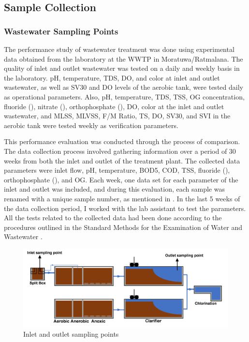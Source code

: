 \subsection{Sample Collection}

\subsubsection{Wastewater Sampling Points}
The performance study of wastewater treatment was done using experimental data obtained from the laboratory at the \ac{WWTP} in Moratuwa/Ratmalana. The quality of inlet and outlet wastewater was tested on a daily and weekly basis in the laboratory. pH, temperature, \ac{TDS}, \ac{DO}, and color at inlet and outlet wastewater, as well as \ac{SV30} and \ac{DO} levels of the aerobic tank, were tested daily as operational parameters. Also, pH, temperature, \ac{TDS}, \ac{TSS}, \ac{OG} concentration, fluoride (), nitrate (), orthophosphate (), \ac{DO}, color at the inlet and outlet wastewater, and \ac{MLSS}, \ac{MLVSS}, \ac{F/M Ratio}, \ac{TS}, \ac{DO}, \ac{SV30}, and \ac{SVI} in the aerobic tank were tested weekly as verification parameters.

This performance evaluation was conducted through the process of comparison. The data collection process involved gathering information over a period of 30 weeks from both the inlet and outlet of the treatment plant. The collected data parameters were inlet flow, pH, temperature, \ac{BOD5}, \ac{COD}, \ac{TSS}, fluoride (), orthophosphate (), and \ac{OG}. Each week, one data set for each parameter of the inlet and outlet was included, and during this evaluation, each sample was renamed with a unique sample number, as mentioned in . In the last 5 weeks of the data collection period, I worked with the lab assistant to test the parameters. All the tests related to the collected data had been done according to the procedures outlined in the Standard Methods for the Examination of Water and Wastewater \cite{APHA}.


\begin{figure}[H]
\centering
\includegraphics[width=1\linewidth]{material_and_methodology/sample_point_inlet_outlet.png}


\caption{Inlet and outlet sampling points}
\label{fig:sample_points_inlet_outlet}
\end{figure}



